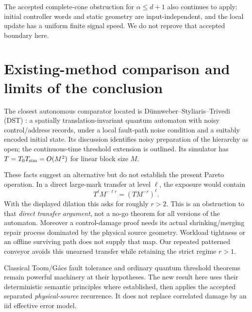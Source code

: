 \documentclass[11pt]{article}
\begin{document}
The accepted complete-cone obstruction for $\alpha\leq d+1$ also
continues to apply: initial controller words and static geometry are
input-independent, and the local update has a uniform finite signal
speed. We do not reprove that accepted boundary here.

\section{Existing-method comparison and limits of the conclusion}

The closest autonomous comparator located is
D\"unnweber--Styliaris--Trivedi (DST) \cite{DST}: a spatially
translation-invariant quantum automaton with noisy control/address
records, under a local fault-path noise condition and a suitably encoded
initial state. Its discussion identifies noisy preparation of the
hierarchy as open; the continuous-time threshold extension is outlined.
Its simulator has $T=T_0T_{\rm sim}=O(M^2)$ for linear block size $M$.

These facts suggest an alternative but do not establish the present
Pareto operation. In a direct large-mark transfer at level $\ell$, the
exposure would contain
\[
 T^\ell M^{-\ell r}=(TM^{-r})^\ell.
\]
With the displayed dilation this asks for roughly $r>2$. This is an
obstruction to that \emph{direct transfer argument}, not a no-go theorem
for all versions of the automaton. Moreover a control-damage proof needs
its actual shrinking/merging repair process dominated by the physical
source geometry. Workload tightness or an offline surviving path does
not supply that map. Our repeated patterned conveyor avoids this
unearned transfer while retaining the strict regime $r>1$.

Classical Toom/G\'acs fault tolerance and ordinary quantum threshold
theorems remain powerful machinery at their hypotheses. The new result
here uses their deterministic semantic principles where established,
then applies the accepted separated \emph{physical-source} recurrence.
It does not replace correlated damage by an iid effective error model.
\end{document}
